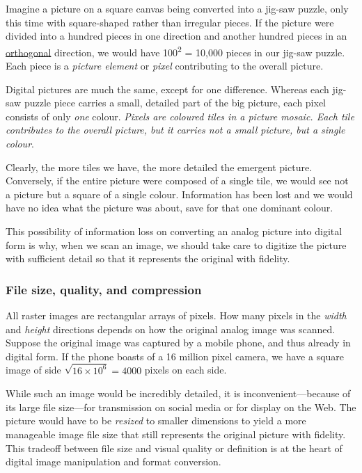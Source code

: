 \documentclass[
  12pt,
  british,
  a4paper,
  rgb,
  dvipsnames,
  svgnames,
  hyphens]{article}
\begin{document}
Imagine a picture on a square canvas being converted into a jig-saw
puzzle, only this time with square-shaped rather than irregular pieces.
If the picture were divided into a hundred pieces in one direction and
another hundred pieces in an
\href{https://en.wikipedia.org/wiki/Orthogonality}{orthogonal}
direction, we would have 100\textsuperscript{2} = 10,000 pieces in our
jig-saw puzzle. Each piece is a \emph{picture element} or \emph{pixel}
contributing to the overall picture.

Digital pictures are much the same, except for one difference. Whereas
each jig-saw puzzle piece carries a small, detailed part of the big
picture, each pixel consists of only \emph{one} colour. \emph{Pixels are
coloured tiles in a picture mosaic. Each tile contributes to the overall
picture, but it carries not a small picture, but a single colour}.

Clearly, the more tiles we have, the more detailed the emergent picture.
Conversely, if the entire picture were composed of a single tile, we
would see not a picture but a square of a single colour. Information has
been lost and we would have no idea what the picture was about, save for
that one dominant colour.

This possibility of information loss on converting an analog picture
into digital form is why, when we scan an image, we should take care to
digitize the picture with sufficient detail so that it represents the
original with fidelity.

\hypertarget{file-size-quality-and-compression}{%
\subsubsection{File size, quality, and
compression}\label{file-size-quality-and-compression}}

All raster images are rectangular arrays of pixels. How many pixels in
the \emph{width} and \emph{height} directions depends on how the
original analog image was scanned. Suppose the original image was
captured by a mobile phone, and thus already in digital form. If the
phone boasts of a 16 million pixel camera, we have a square image of
side \(\sqrt{16\times 10^6} = 4000\) pixels on each side.

While such an image would be incredibly detailed, it is
inconvenient---because of its large file size---for transmission on
social media or for display on the Web. The picture would have to be
\emph{resized} to smaller dimensions to yield a more manageable image
file size that still represents the original picture with fidelity. This
tradeoff between file size and visual quality or definition is at the
heart of digital image manipulation and format conversion.
\end{document}
